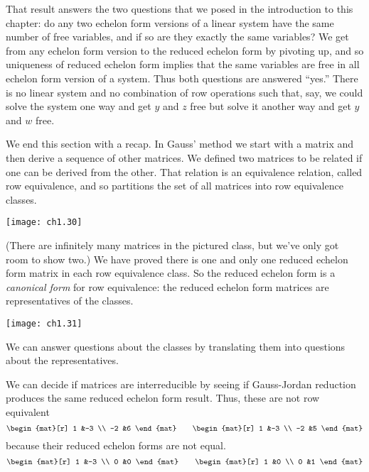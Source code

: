 That result answers the two questions that we posed in the introduction
to this chapter: do any two echelon form versions of a linear system 
have the same number of free variables, and if so are they
exactly the same variables?
We get from any echelon form version to the reduced echelon form by pivoting up,
and so uniqueness of reduced echelon form implies that the same variables 
are free in all echelon form version of a system.
Thus both questions are answered ``yes.''
There is no linear system and no combination of row operations such
that, say, we could solve the system 
one way and get $y$ and $z$ free but solve it
another way and get $y$ and $w$ free.

We end this section with a recap.
In Gauss' method we start with a matrix and then
derive a sequence of other matrices.
We defined two matrices to be related if one can be derived from the other.
That relation is an equivalence relation, %
called row equivalence, and
so partitions the set of all matrices into row equivalence classes.
\begin{center}
  \texttt{[image: ch1.30]}
\end{center}
(There are infinitely many matrices in the pictured class, but we've only
got room to show two.)
We have proved there is one and only one reduced echelon form matrix in
each row equivalence class.
So the reduced echelon form is a
{\em canonical form}%
%
%
for row equivalence:
the reduced echelon form matrices are
representatives of the classes.
\begin{center}
  \texttt{[image: ch1.31]}
\end{center}
We can answer questions about the classes by translating them
into questions about the representatives.

\begin{example}  \label{ex:MatsNotRowEq}
We can decide if matrices are interreducible
by seeing if Gauss-Jordan reduction produces the same
reduced echelon form result.
Thus, these are not row equivalent
\begin{equation*}
  \begin{mat}[r]
    1  &-3  \\
   -2  &6
  \end{mat}
  \qquad
  \begin{mat}[r]
    1  &-3  \\
   -2  &5
  \end{mat}
\end{equation*}
because their reduced echelon forms are not equal.
\begin{equation*}
  \begin{mat}[r]
    1  &-3  \\
    0  &0
  \end{mat}
  \qquad
  \begin{mat}[r]
    1  &0   \\
    0  &1
  \end{mat}
\end{equation*}
\end{example}

